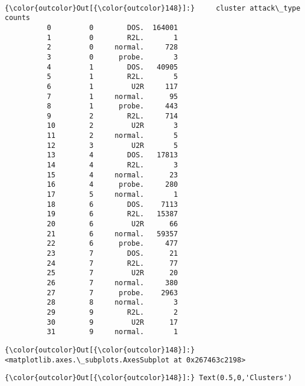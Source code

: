 \documentclass[11pt]{article}
\begin{document}
    \begin{center}
    \end{center}
    { \hspace*{\fill} \\}
    
\begin{Verbatim}[commandchars=\\\{\}]
{\color{outcolor}Out[{\color{outcolor}148}]:}     cluster attack\_type  counts
          0         0        DOS.  164001
          1         0        R2L.       1
          2         0     normal.     728
          3         0      probe.       3
          4         1        DOS.   40905
          5         1        R2L.       5
          6         1         U2R     117
          7         1     normal.      95
          8         1      probe.     443
          9         2        R2L.     714
          10        2         U2R       3
          11        2     normal.       5
          12        3         U2R       5
          13        4        DOS.   17813
          14        4        R2L.       3
          15        4     normal.      23
          16        4      probe.     280
          17        5     normal.       1
          18        6        DOS.    7113
          19        6        R2L.   15387
          20        6         U2R      66
          21        6     normal.   59357
          22        6      probe.     477
          23        7        DOS.      21
          24        7        R2L.      77
          25        7         U2R      20
          26        7     normal.     380
          27        7      probe.    2963
          28        8     normal.       3
          29        9        R2L.       2
          30        9         U2R      17
          31        9     normal.       1
\end{Verbatim}
            
\begin{Verbatim}[commandchars=\\\{\}]
{\color{outcolor}Out[{\color{outcolor}148}]:} <matplotlib.axes.\_subplots.AxesSubplot at 0x267463c2198>
\end{Verbatim}
            
\begin{Verbatim}[commandchars=\\\{\}]
{\color{outcolor}Out[{\color{outcolor}148}]:} Text(0.5,0,'Clusters')
\end{Verbatim}
            
\end{document}
